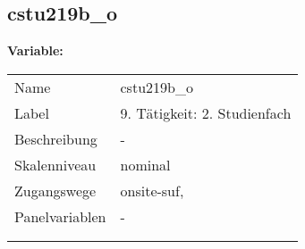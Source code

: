 	
	
	\subsection{cstu219b\_o}
	\label{subSection:cstu219b_o}

	\noindent\textbf{Variable:}\\
		\begin{tabular}{lL{11.3cm}}
			\label{tableVariable:cstu219b_o}
			Name & cstu219b\_o \\
			Label & 9. Tätigkeit: 2. Studienfach \\
			Beschreibung & - \\
			Skalenniveau & nominal \\
			Zugangswege &
				onsite-suf,
 \\
			Panelvariablen & -
			 \\
			 \\
 \\
		\end{tabular}






